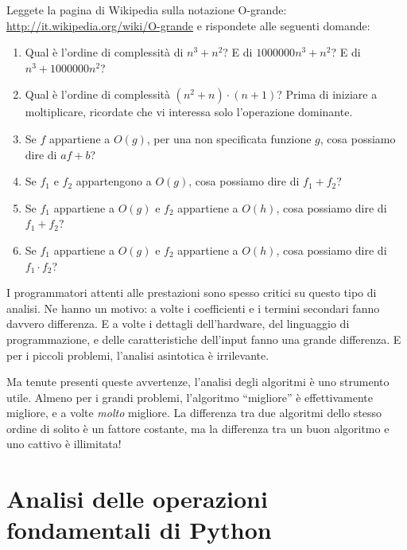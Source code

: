 \documentclass[10pt]{book}
\begin{document}
\vspace{0.2in}
\begin{exercise}

Leggete la pagina di Wikipedia sulla notazione O-grande: 
\url{http://it.wikipedia.org/wiki/O-grande} e rispondete alle seguenti domande:

\begin{enumerate}
\item Qual è l'ordine di complessità di $n^3 + n^2$?
E di $1000000 n^3 + n^2$?
E di $n^3 + 1000000 n^2$?

\item Qual è l'ordine di complessità $(n^2 + n) \cdot (n + 1)$?  Prima di iniziare a moltiplicare, ricordate che vi interessa solo l'operazione dominante.

\item Se $f$ appartiene a $O(g)$, per una non specificata funzione $g$, cosa possiamo dire di $af+b$?

\item Se $f_1$ e $f_2$ appartengono a $O(g)$, cosa possiamo dire di $f_1 + f_2$?

\item Se $f_1$ appartiene a $O(g)$
e $f_2$ appartiene a $O(h)$,
cosa possiamo dire di  $f_1 + f_2$?

\item Se  $f_1$ appartiene a $O(g)$ e $f_2$ appartiene a $O(h)$,
cosa possiamo dire di  $f_1 \cdot f_2$?
\end{enumerate}

\end{exercise}

I programmatori attenti alle prestazioni sono spesso critici su questo tipo di analisi. Ne hanno un motivo: a volte i coefficienti e i termini secondari fanno davvero differenza. E a volte i dettagli dell'hardware, del linguaggio di programmazione, e delle caratteristiche dell'input fanno una grande differenza. E per i piccoli problemi, l'analisi asintotica è irrilevante.


Ma tenute presenti queste avvertenze, l'analisi degli algoritmi è uno strumento utile. Almeno per i grandi problemi, l'algoritmo ``migliore'' è effettivamente migliore, e a volte {\em molto} migliore. La differenza tra due algoritmi dello stesso ordine di solito è un fattore costante, ma la differenza tra un buon algoritmo e uno cattivo è illimitata!


\section{Analisi delle operazioni fondamentali di Python}
\end{document}
